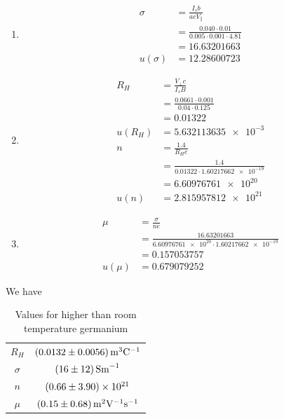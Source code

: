\documentclass[12pt]{article}
\numberwithin{equation}{section}
\numberwithin{figure}{section}
\numberwithin{table}{section}
\begin{document}
    \begin{enumerate}
        \item 
        \begin{align*}
            \sigma&=\frac{I_s b}{acV_\parallel}\\
            &=\frac{0.040\cdot0.01}{0.005\cdot0.001\cdot4.81}\\
            &=16.63201663\\
            u(\sigma)&=12.28600723
        \end{align*}
        \item 
        \begin{align*}
            R_H&=\frac{V_\perp c}{I_s B}\\
            &=\frac{0.0661\cdot0.001}{0.04\cdot0.125}\\
            &=0.01322\\
            u(R_H)&=\num{5.632113635e-3}\\
            n&=\frac{1.4}{R_H e}\\
            &=\frac{1.4}{0.01322\cdot\num{1.60217662e-19}}\\
            &=\num{6.60976761e20}\\
            u(n)&=\num{2.815957812e21}
        \end{align*}
        \item 
        \begin{align*}
            \mu&=\frac{\sigma}{ne}\\
            &=\frac{16.63201663}{\num{6.60976761e20}\cdot\num{1.60217662e-19}}\\
            &=0.157053757\\
            u(\mu)&=0.679079252
        \end{align*}
    \end{enumerate}
    We have 
    \begin{table}[H]
        \centering
        \begin{tabular}{c|c}
            $R_H$ & $\SI{0.0132\pm0.0056}{\metre^3 \coulomb^{-1}}$ \\
            $\sigma$ & $\SI{16\pm12}{\siemens\metre^{-1}}$\\
            $n$ & $\num{0.66\pm3.9e21}$\\
            $\mu$ & $\SI{0.15\pm0.68}{\metre^2\volt^{-1}\second^{-1}}$
        \end{tabular}
        \caption{Values for higher than room temperature germanium}
        \label{tbl:High Temp}
    \end{table}
\end{document}
